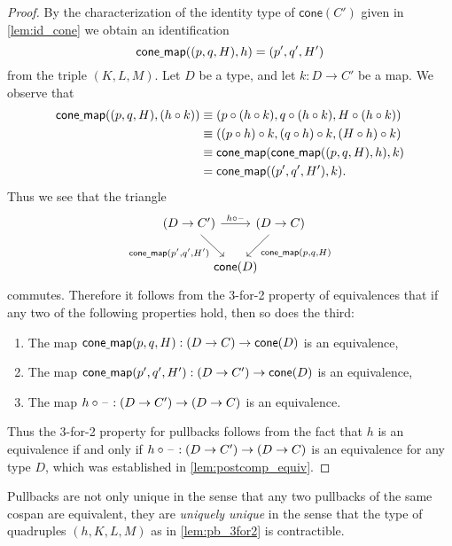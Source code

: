 \begin{proof}
By the characterization of the identity type of $\mathsf{cone}(C')$ given in \cref{lem:id_cone} we obtain an identification
\begin{equation*}
\mathsf{cone\underline{\ }{}map}((p,q,H),h)=(p',q',H')
\end{equation*}
from the triple $(K,L,M)$. 
Let $D$ be a type, and let $k:D\to C'$ be a map. We observe that
\begin{align*}
\mathsf{cone\underline{\ }{}map}((p,q,H),(h\circ k)) & \equiv (p\circ (h\circ k),q\circ (h\circ k),H\circ (h\circ k)) \\
& \equiv ((p\circ h)\circ k,(q\circ h)\circ k, (H\circ h)\circ k) \\
& \equiv \mathsf{cone\underline{\ }{}map}(\mathsf{cone\underline{\ }{}map}((p,q,H),h),k) \\
& = \mathsf{cone\underline{\ }{}map}((p',q',H'),k).
\end{align*}
Thus we see that the triangle 
\begin{equation*}
\begin{tikzcd}[column sep=-1em]
(D\to C') \arrow[rr,"{h\circ \blank}"] \arrow[dr,swap,"{\mathsf{cone\usc{}map}(p',q',H')}"] & & (D\to C) \arrow[dl,"{\mathsf{cone\usc{}map}(p,q,H)}"] \\
& \mathsf{cone}(D)
\end{tikzcd}
\end{equation*}
commutes. Therefore it follows from the 3-for-2 property of equivalences that if any two of the following properties hold, then so does the third:
\begin{enumerate}
\item The map $\mathsf{cone\underline{\ }{}map}(p,q,H):(D\to C)\to \mathsf{cone}(D)$ is an equivalence,
\item The map $\mathsf{cone\underline{\ }{}map}(p',q',H'):(D\to C')\to \mathsf{cone}(D)$ is an equivalence,
\item The map $h\circ\mathord{\hspace{1pt}\text{--}\hspace{1pt}} : (D\to C')\to (D\to C)$ is an equivalence.
\end{enumerate}
Thus the 3-for-2 property for pullbacks follows from the fact that $h$ is an equivalence if and only if $h\circ\mathord{\hspace{1pt}\text{--}\hspace{1pt}} : (D\to C')\to (D\to C)$ is an equivalence for any type $D$, which was established in \cref{lem:postcomp_equiv}.
\end{proof}

Pullbacks are not only unique in the sense that any two pullbacks of the same cospan are equivalent, they are \emph{uniquely unique} in the sense that the type of quadruples $(h,K,L,M)$ as in \cref{lem:pb_3for2} is contractible.

